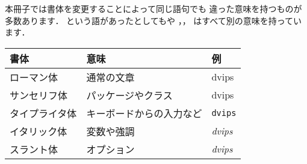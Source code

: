 本冊子では書体を変更することによって同じ語句でも
違った意味を持つものが多数あります．
という語があったとしてもや
，，
はすべて別の意味を持っています．
\begin{center}
 \begin{tabular}{lll}
 \hline
 書体          & 意味      & 例\\
 \hline
 ローマン体    & 通常の文章& \textrm{dvips}\\
 サンセリフ体  & パッケージやクラス& \textsf{dvips}\\
 タイプライタ体& キーボードからの入力など& \texttt{dvips}\\
 イタリック体  & 変数や強調& \textit{dvips}\\
 スラント体    & オプション& \textsl{dvips}\\
 \hline
 \end{tabular}
\end{center}





